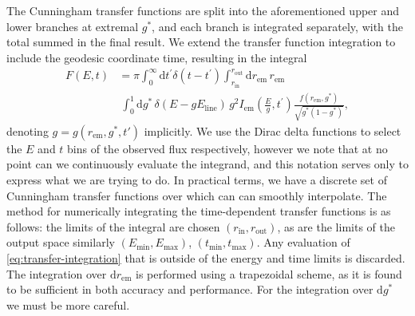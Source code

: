 \documentclass[fleqn,usenatbib]{mnras}
\renewcommand{\d}{\text{d}}
\begin{document}
The Cunningham transfer functions are split into the aforementioned
upper and lower branches at extremal $g^\ast$, and each branch is integrated
separately, with the total summed in the final result. We extend the transfer
function integration to include the geodesic coordinate time, resulting in the
integral
\begin{align}
    \label{eq:transfer-integration}
    F(E, t) &=
    \pi
    \int_0^\infty \d t^\prime \delta(t - t^\prime)
    \int_{r_\text{in}}^{r_\text{out}} \d r_\text{em}\,r_\text{em} \nonumber \\
    &\ \int_0^1 \d g^\ast\, \delta(E - gE_\text{line})\, g^2 I_\text{em}\left(\frac{E}{g}, t^\prime\right) \frac{f(r_\text{em}, g^\ast)}{\sqrt{g^\ast (1 - g^\ast)}},
\end{align}
denoting $g = g( r_\text{em}, g^\ast, t')$ implicitly. We use the Dirac delta
functions to select the $E$ and $t$ bins of the observed flux respectively,
however we note that at no point can we continuously evaluate the integrand, and
this notation serves only to express what we are trying to do. In practical
terms, we have a discrete set of Cunningham transfer functions over which can
can smoothly interpolate. The method for numerically integrating the
time-dependent transfer functions is as follows: the limits of the integral are
chosen $(r_\text{in}, r_\text{out})$, as are the limits of the output space
similarly $(E_\text{min}, E_\text{max})$, $(t_\text{min}, t_\text{max})$. Any
evaluation of \eqref{eq:transfer-integration} that is outside of the energy and
time limits is discarded. The integration over $\d r_\text{em}$ is performed
using a trapezoidal scheme, as it is found to be sufficient in both accuracy and
performance. For the integration over $\d g^\ast$ we must be more careful.
\end{document}
